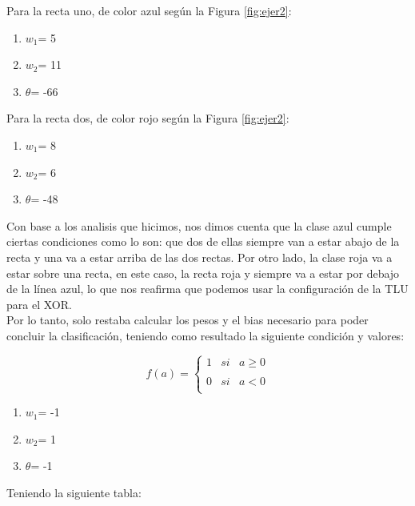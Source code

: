 \documentclass[12pt,twoside]{article}
\begin{document}
Para la recta uno, de color azul según la Figura \ref{fig:ejer2}:
\begin{enumerate}
    \item \textbf{$w_{1}$}= 5
    \item \textbf{$w_{2}$}= 11 
    \item \textbf{$\theta$}= -66 
\end{enumerate}

Para la recta dos, de color rojo según la Figura \ref{fig:ejer2}:

\begin{enumerate}
    \item \textbf{$w_{1}$}= 8
    \item \textbf{$w_{2}$}= 6 
    \item \textbf{$\theta$}= -48 
\end{enumerate}


Con base a los analisis que hicimos, nos dimos cuenta que la clase azul
cumple ciertas condiciones como lo son: que dos de ellas siempre van a 
estar abajo de la recta y una va a estar arriba de las dos rectas. Por otro
lado, la clase roja va a estar sobre una recta, en este caso, la recta roja 
y siempre va a estar por debajo de la línea azul, lo que nos reafirma que
podemos usar la configuración de la TLU para el XOR.\\

Por lo tanto, solo restaba calcular los pesos y el bias necesario para 
poder concluir la clasificación, teniendo como resultado la siguiente condición y
valores:

\begin{equation}
    f(a) = \left\{ \begin{array}{lcc}
        1 &   si  & a \geq 0 \\
        \\0 &  si & a < 0 \\
        \end{array}
    \right.
\end{equation}

\begin{enumerate}
    \item \textbf{$w_{1}$}= -1
    \item \textbf{$w_{2}$}= 1
    \item \textbf{$\theta$}= -1 
\end{enumerate}

\newpage
Teniendo la siguiente tabla:
\end{document}
